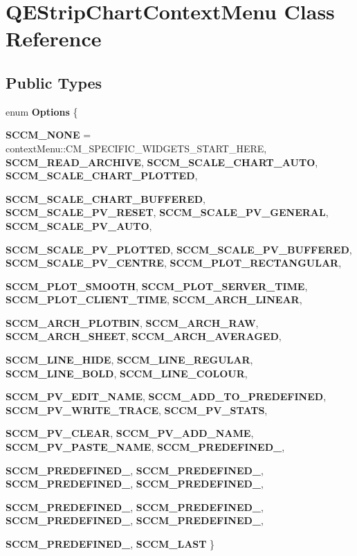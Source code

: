 \hypertarget{classQEStripChartContextMenu}{
\section{QEStripChartContextMenu Class Reference}
\label{classQEStripChartContextMenu}
}
\subsection*{Public Types}
\begin{DoxyCompactItemize}
\item 
enum {\bfseries Options} \{ \par
{\bfseries SCCM\_\-NONE} =  contextMenu::CM\_\-SPECIFIC\_\-WIDGETS\_\-START\_\-HERE, 
{\bfseries SCCM\_\-READ\_\-ARCHIVE}, 
{\bfseries SCCM\_\-SCALE\_\-CHART\_\-AUTO}, 
{\bfseries SCCM\_\-SCALE\_\-CHART\_\-PLOTTED}, 
\par
{\bfseries SCCM\_\-SCALE\_\-CHART\_\-BUFFERED}, 
{\bfseries SCCM\_\-SCALE\_\-PV\_\-RESET}, 
{\bfseries SCCM\_\-SCALE\_\-PV\_\-GENERAL}, 
{\bfseries SCCM\_\-SCALE\_\-PV\_\-AUTO}, 
\par
{\bfseries SCCM\_\-SCALE\_\-PV\_\-PLOTTED}, 
{\bfseries SCCM\_\-SCALE\_\-PV\_\-BUFFERED}, 
{\bfseries SCCM\_\-SCALE\_\-PV\_\-CENTRE}, 
{\bfseries SCCM\_\-PLOT\_\-RECTANGULAR}, 
\par
{\bfseries SCCM\_\-PLOT\_\-SMOOTH}, 
{\bfseries SCCM\_\-PLOT\_\-SERVER\_\-TIME}, 
{\bfseries SCCM\_\-PLOT\_\-CLIENT\_\-TIME}, 
{\bfseries SCCM\_\-ARCH\_\-LINEAR}, 
\par
{\bfseries SCCM\_\-ARCH\_\-PLOTBIN}, 
{\bfseries SCCM\_\-ARCH\_\-RAW}, 
{\bfseries SCCM\_\-ARCH\_\-SHEET}, 
{\bfseries SCCM\_\-ARCH\_\-AVERAGED}, 
\par
{\bfseries SCCM\_\-LINE\_\-HIDE}, 
{\bfseries SCCM\_\-LINE\_\-REGULAR}, 
{\bfseries SCCM\_\-LINE\_\-BOLD}, 
{\bfseries SCCM\_\-LINE\_\-COLOUR}, 
\par
{\bfseries SCCM\_\-PV\_\-EDIT\_\-NAME}, 
{\bfseries SCCM\_\-ADD\_\-TO\_\-PREDEFINED}, 
{\bfseries SCCM\_\-PV\_\-WRITE\_\-TRACE}, 
{\bfseries SCCM\_\-PV\_\-STATS}, 
\par
{\bfseries SCCM\_\-PV\_\-CLEAR}, 
{\bfseries SCCM\_\-PV\_\-ADD\_\-NAME}, 
{\bfseries SCCM\_\-PV\_\-PASTE\_\-NAME}, 
{\bfseries SCCM\_\-PREDEFINED\_}, 
\par
{\bfseries SCCM\_\-PREDEFINED\_}, 
{\bfseries SCCM\_\-PREDEFINED\_}, 
{\bfseries SCCM\_\-PREDEFINED\_}, 
{\bfseries SCCM\_\-PREDEFINED\_}, 
\par
{\bfseries SCCM\_\-PREDEFINED\_}, 
{\bfseries SCCM\_\-PREDEFINED\_}, 
{\bfseries SCCM\_\-PREDEFINED\_}, 
{\bfseries SCCM\_\-PREDEFINED\_}, 
\par
{\bfseries SCCM\_\-PREDEFINED\_}, 
{\bfseries SCCM\_\-LAST}
 \}
\end{DoxyCompactItemize}
